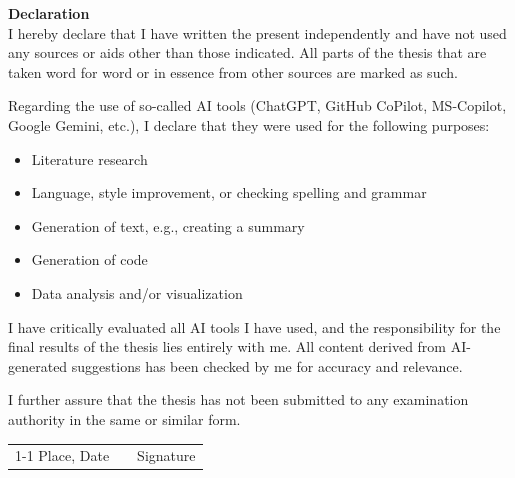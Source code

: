 \textbf{\Large Declaration}\\
I hereby declare that I have written the present {\ArtArbeit} independently and have not used any sources or aids other than those indicated. All parts of the thesis that are taken word for word or in essence from other sources are marked as such.

Regarding the use of so-called AI tools (ChatGPT, GitHub CoPilot, MS-Copilot, Google Gemini, etc.), I declare that they were used for the following purposes:

\begin{itemize}
    \item Literature research
    \item Language, style improvement, or checking spelling and grammar
    \item Generation of text, e.g., creating a summary
    \item Generation of code
    \item Data analysis and/or visualization
\end{itemize}

I have critically evaluated all AI tools I have used, and the responsibility for the final results of the thesis lies entirely with me. All content derived from AI-generated suggestions has been checked by me for accuracy and relevance.

I further assure that the thesis has not been submitted to any examination authority in the same or similar form.

\vspace{1.5cm}
\begin{tabular}{lp{2em}l} 
	\hspace{5cm}   && \hspace{4cm} \\\cline{1-1}\cline{3-3} 
	Place, Date     && Signature 
\end{tabular}